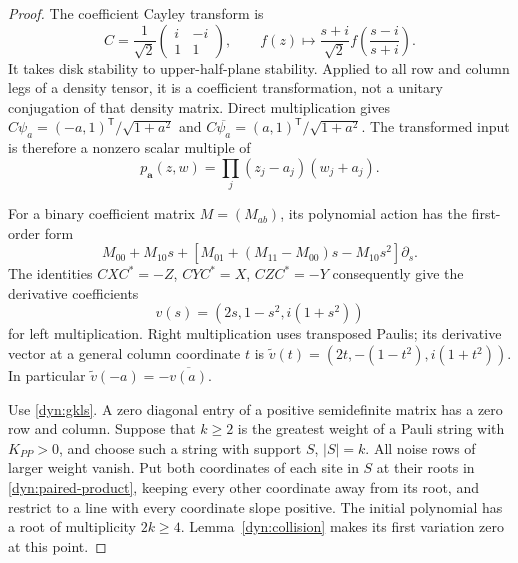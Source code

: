 \documentclass[reqno]{amsart}
\theoremstyle{definition}
\theoremstyle{remark}
\begin{document}
\begin{proof}
The coefficient Cayley transform is
\begin{equation}\label{dyn:cayley}
 C=\frac1{\sqrt2}\begin{pmatrix}i&-i\\1&1\end{pmatrix},\qquad
 f(z)\longmapsto\frac{s+i}{\sqrt2}
 f\left(\frac{s-i}{s+i}\right).
\end{equation}
It takes disk stability to upper-half-plane stability.  Applied to all row
and column legs of a density tensor, it is a coefficient transformation,
not a unitary conjugation of that density matrix.  Direct multiplication
gives $C\psi_a=(-a,1)^{\mathsf T}/\sqrt{1+a^2}$ and
$C\overline{\psi_a}=(a,1)^{\mathsf T}/\sqrt{1+a^2}$.  The transformed
input is therefore a nonzero scalar multiple of
\begin{equation}\label{dyn:paired-product}
 p_{\boldsymbol a}(z,w)=\prod_j(z_j-a_j)(w_j+a_j).
\end{equation}

For a binary coefficient matrix $M=(M_{ab})$, its polynomial action has
the first-order form
\[
 M_{00}+M_{10}s+
 [M_{01}+(M_{11}-M_{00})s-M_{10}s^2]\partial_s.
\]
The identities $CXC^*=-Z$, $CYC^*=X$, $CZC^*=-Y$ consequently give
the derivative coefficients
\begin{equation}\label{dyn:pauli-vectors}
 v(s)=(2s,1-s^2,i(1+s^2))
\end{equation}
for left multiplication.  Right multiplication uses transposed Paulis;
its derivative vector at a general column coordinate $t$ is
$\widetilde v(t)=(2t,-(1-t^2),i(1+t^2))$.  In particular
$\widetilde v(-a)=-\overline{v(a)}$.

Use \eqref{dyn:gkls}.  A zero diagonal entry of a positive semidefinite
matrix has a zero row and column.  Suppose that $k\ge2$ is the greatest
weight of a Pauli string with $K_{PP}>0$, and choose such a string with
support $S$, $|S|=k$.  All noise rows of larger weight vanish.  Put both
coordinates of each site in $S$ at their roots in
\eqref{dyn:paired-product}, keeping every other coordinate away from its
root, and restrict to a line with every coordinate slope positive.
The initial polynomial has a root of multiplicity $2k\ge4$.
Lemma~\ref{dyn:collision} makes its first variation zero at this point.


\end{proof}
\end{document}
